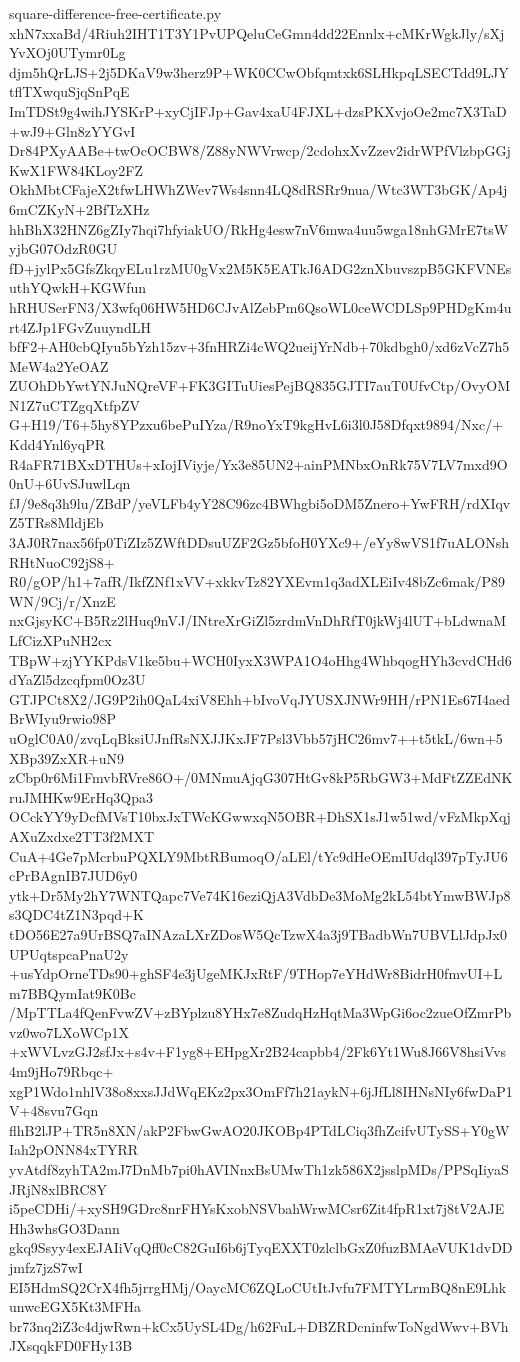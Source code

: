 \documentclass[11pt]{article}
\theoremstyle{definition}
\theoremstyle{remark}
\begin{document}
\begin{filecontents*}[overwrite]{square-difference-free-certificate.py}
xhN7xxaBd/4Riuh2IHT1T3Y1PvUPQeluCeGmn4dd22Ennlx+cMKrWgkJly/sXjYvXOj0UTymr0Lg
djm5hQrLJS+2j5DKaV9w3herz9P+WK0CCwObfqmtxk6SLHkpqLSECTdd9LJYtflTXwquSjqSnPqE
ImTDSt9g4wihJYSKrP+xyCjIFJp+Gav4xaU4FJXL+dzsPKXvjoOe2mc7X3TaD+wJ9+Gln8zYYGvI
Dr84PXyAABe+twOcOCBW8/Z88yNWVrwcp/2cdohxXvZzev2idrWPfVlzbpGGjKwX1FW84KLoy2FZ
OkhMbtCFajeX2tfwLHWhZWev7Ws4snn4LQ8dRSRr9nua/Wtc3WT3bGK/Ap4j6mCZKyN+2BfTzXHz
hhBhX32HNZ6gZIy7hqi7hfyiakUO/RkHg4esw7nV6mwa4uu5wga18nhGMrE7tsWyjbG07OdzR0GU
fD+jylPx5GfsZkqyELu1rzMU0gVx2M5K5EATkJ6ADG2znXbuvszpB5GKFVNEsuthYQwkH+KGWfun
hRHUSerFN3/X3wfq06HW5HD6CJvAlZebPm6QsoWL0ceWCDLSp9PHDgKm4urt4ZJp1FGvZuuyndLH
bfF2+AH0cbQIyu5bYzh15zv+3fnHRZi4cWQ2ueijYrNdb+70kdbgh0/xd6zVcZ7h5MeW4a2YeOAZ
ZUOhDbYwtYNJuNQreVF+FK3GITuUiesPejBQ835GJTI7auT0UfvCtp/OvyOMN1Z7uCTZgqXtfpZV
G+H19/T6+5hy8YPzxu6bePuIYza/R9noYxT9kgHvL6i3l0J58Dfqxt9894/Nxc/+Kdd4Ynl6yqPR
R4aFR71BXxDTHUs+xIojIViyje/Yx3e85UN2+ainPMNbxOnRk75V7LV7mxd9O0nU+6UvSJuwlLqn
fJ/9e8q3h9lu/ZBdP/yeVLFb4yY28C96zc4BWhgbi5oDM5Znero+YwFRH/rdXIqvZ5TRs8MldjEb
3AJ0R7nax56fp0TiZIz5ZWftDDsuUZF2Gz5bfoH0YXc9+/eYy8wVS1f7uALONshRHtNuoC92jS8+
R0/gOP/h1+7afR/IkfZNf1xVV+xkkvTz82YXEvm1q3adXLEiIv48bZc6mak/P89WN/9Cj/r/XnzE
nxGjsyKC+B5Rz2lHuq9nVJ/INtreXrGiZl5zrdmVnDhRfT0jkWj4lUT+bLdwnaMLfCizXPuNH2cx
TBpW+zjYYKPdsV1ke5bu+WCH0IyxX3WPA1O4oHhg4WhbqogHYh3cvdCHd6dYaZl5dzcqfpm0Oz3U
GTJPCt8X2/JG9P2ih0QaL4xiV8Ehh+bIvoVqJYUSXJNWr9HH/rPN1Es67I4aedBrWIyu9rwio98P
uOglC0A0/zvqLqBksiUJnfRsNXJJKxJF7Psl3Vbb57jHC26mv7++t5tkL/6wn+5XBp39ZxXR+uN9
zCbp0r6Mi1FmvbRVre86O+/0MNmuAjqG307HtGv8kP5RbGW3+MdFtZZEdNKruJMHKw9ErHq3Qpa3
OCckYY9yDcfMVsT10bxJxTWcKGwwxqN5OBR+DhSX1sJ1w51wd/vFzMkpXqjAXuZxdxe2TT3f2MXT
CuA+4Ge7pMcrbuPQXLY9MbtRBumoqO/aLEl/tYc9dHeOEmIUdql397pTyJU6cPrBAgnIB7JUD6y0
ytk+Dr5My2hY7WNTQapc7Ve74K16eziQjA3VdbDe3MoMg2kL54btYmwBWJp8s3QDC4tZ1N3pqd+K
tDO56E27a9UrBSQ7aINAzaLXrZDosW5QcTzwX4a3j9TBadbWn7UBVLlJdpJx0UPUqtspcaPnaU2y
+usYdpOrneTDs90+ghSF4e3jUgeMKJxRtF/9THop7eYHdWr8BidrH0fmvUI+Lm7BBQymIat9K0Bc
/MpTTLa4fQenFvwZV+zBYplzu8YHx7e8ZudqHzHqtMa3WpGi6oc2zueOfZmrPbvz0wo7LXoWCp1X
+xWVLvzGJ2sfJx+s4v+F1yg8+EHpgXr2B24capbb4/2Fk6Yt1Wu8J66V8hsiVvs4m9jHo79Rbqc+
xgP1Wdo1nhlV38o8xxsJJdWqEKz2px3OmFf7h21aykN+6jJfLl8IHNsNIy6fwDaP1V+48svu7Gqn
flhB2lJP+TR5n8XN/akP2FbwGwAO20JKOBp4PTdLCiq3fhZcifvUTySS+Y0gWIah2pONN84xTYRR
yvAtdf8zyhTA2mJ7DnMb7pi0hAVINnxBsUMwTh1zk586X2jsslpMDs/PPSqIiyaSJRjN8xlBRC8Y
i5peCDHi/+xySH9GDrc8nrFHYsKxobNSVbahWrwMCsr6Zit4fpR1xt7j8tV2AJEHh3whsGO3Dann
gkq9Ssyy4exEJAIiVqQff0cC82GuI6b6jTyqEXXT0zlclbGxZ0fuzBMAeVUK1dvDDjmfz7jzS7wI
EI5HdmSQ2CrX4fh5jrrgHMj/OaycMC6ZQLoCUtItJvfu7FMTYLrmBQ8nE9LhkunwcEGX5Kt3MFHa
br73nq2iZ3c4djwRwn+kCx5UySL4Dg/h62FuL+DBZRDcninfwToNgdWwv+BVhJXsqqkFD0FHy13B

\end{filecontents*}
\end{document}
